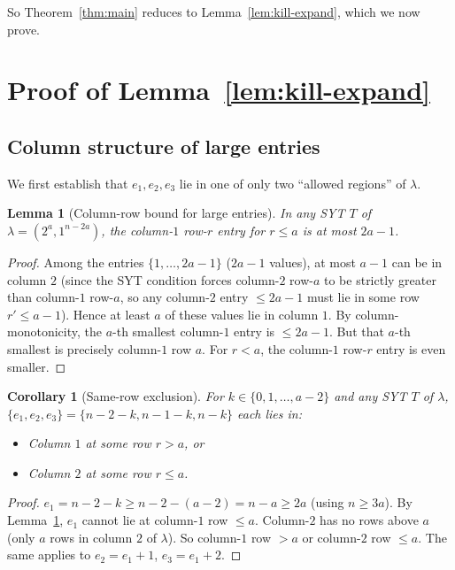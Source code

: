 \documentclass[11pt]{article}
\newtheorem{lemma}[theorem]{Lemma}
\newtheorem{corollary}[theorem]{Corollary}
\theoremstyle{definition}
\begin{document}
\medskip
\noindent
So Theorem~\ref{thm:main} reduces to Lemma~\ref{lem:kill-expand},
which we now prove.

\section{Proof of Lemma~\ref{lem:kill-expand}}\label{sec:proof-lemma}

\subsection{Column structure of large entries}\label{sec:claim4}

We first establish that $e_1,e_2,e_3$ lie in one of only two
``allowed regions'' of $\lambda$.

\begin{lemma}[Column-row bound for large entries]\label{lem:bound}
In any SYT $T$ of $\lambda=(2^a,1^{n-2a})$, the column-$1$ row-$r$
entry for $r\le a$ is at most $2a-1$.
\end{lemma}

\begin{proof}
Among the entries $\{1,\ldots,2a-1\}$ ($2a-1$ values), at most $a-1$
can be in column $2$ (since the SYT condition forces column-$2$
row-$a$ to be strictly greater than column-$1$ row-$a$, so any
column-$2$ entry $\le 2a-1$ must lie in some row $r'\le a-1$).
Hence at least $a$ of these values lie in column $1$.  By
column-monotonicity, the $a$-th smallest column-$1$ entry is
$\le 2a-1$.  But that $a$-th smallest is precisely column-$1$ row $a$.
For $r<a$, the column-$1$ row-$r$ entry is even smaller.
\end{proof}

\begin{corollary}[Same-row exclusion]\label{cor:no-same-row}
For $k\in\{0,1,\ldots,a-2\}$ and any SYT $T$ of $\lambda$,
$\{e_1,e_2,e_3\}=\{n-2-k,n-1-k,n-k\}$ each lies in:
\begin{itemize}[leftmargin=2em,topsep=0.3em,itemsep=0.2em]
\item Column $1$ at some row $r>a$, or
\item Column $2$ at some row $r\le a$.
\end{itemize}
\end{corollary}

\begin{proof}
$e_1=n-2-k\ge n-2-(a-2)=n-a\ge 2a$ (using $n\ge 3a$).  By
Lemma~\ref{lem:bound}, $e_1$ cannot lie at column-$1$ row $\le a$.
Column-$2$ has no rows above $a$ (only $a$ rows in column $2$ of
$\lambda$).  So column-$1$ row $>a$ or column-$2$ row $\le a$.
The same applies to $e_2=e_1+1$, $e_3=e_1+2$.
\end{proof}
\end{document}
